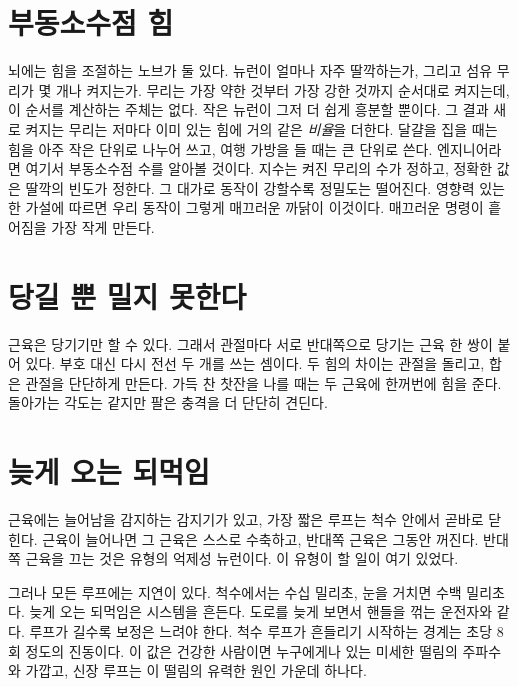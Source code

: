 \section*{부동소수점 힘}

뇌에는 힘을 조절하는 노브가 둘 있다. 뉴런이 얼마나 자주 딸깍하는가, 그리고 섬유 무리가 몇 개나 켜지는가. 무리는 가장 약한 것부터 가장 강한 것까지 순서대로 켜지는데, 이 순서를 계산하는 주체는 없다. 작은 뉴런이 그저 더 쉽게 흥분할 뿐이다. 그 결과 새로 켜지는 무리는 저마다 이미 있는 힘에 거의 같은 \emph{비율}을 더한다. 달걀을 집을 때는 힘을 아주 작은 단위로 나누어 쓰고, 여행 가방을 들 때는 큰 단위로 쓴다. 엔지니어라면 여기서 부동소수점 수를 알아볼 것이다. 지수는 켜진 무리의 수가 정하고, 정확한 값은 딸깍의 빈도가 정한다. 그 대가로 동작이 강할수록 정밀도는 떨어진다. 영향력 있는 한 가설에 따르면 우리 동작이 그렇게 매끄러운 까닭이 이것이다. 매끄러운 명령이 흩어짐을 가장 작게 만든다.

\section*{당길 뿐 밀지 못한다}

근육은 당기기만 할 수 있다. 그래서 관절마다 서로 반대쪽으로 당기는 근육 한 쌍이 붙어 있다. 부호 대신 다시 전선 두 개를 쓰는 셈이다. 두 힘의 차이는 관절을 돌리고, 합은 관절을 단단하게 만든다. 가득 찬 찻잔을 나를 때는 두 근육에 한꺼번에 힘을 준다. 돌아가는 각도는 같지만 팔은 충격을 더 단단히 견딘다.


\section*{늦게 오는 되먹임}

근육에는 늘어남을 감지하는 감지기가 있고, 가장 짧은 루프는 척수 안에서 곧바로 닫힌다. 근육이 늘어나면 그 근육은 스스로 수축하고, 반대쪽 근육은 그동안 꺼진다. 반대쪽 근육을 끄는 것은  유형의 억제성 뉴런이다. 이 유형이 할 일이 여기 있었다.

그러나 모든 루프에는 지연이 있다. 척수에서는 수십 밀리초, 눈을 거치면 수백 밀리초다. 늦게 오는 되먹임은 시스템을 흔든다. 도로를 늦게 보면서 핸들을 꺾는 운전자와 같다. 루프가 길수록 보정은 느려야 한다. 척수 루프가 흔들리기 시작하는 경계는 초당 8회 정도의 진동이다. 이 값은 건강한 사람이면 누구에게나 있는 미세한 떨림의 주파수와 가깝고, 신장 루프는 이 떨림의 유력한 원인 가운데 하나다.

